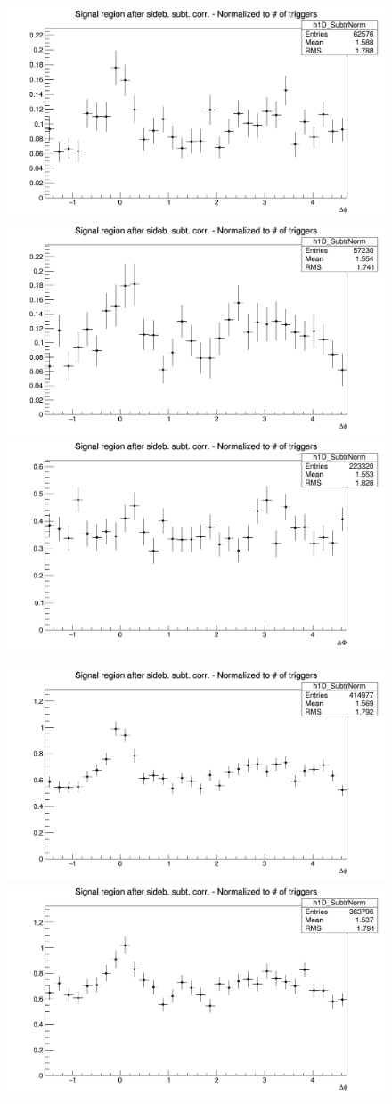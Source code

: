 \begin{figure}[!htbp]
{\includegraphics[width=0.31\linewidth, height=0.23\linewidth]{figures/Dzero/AzimCorrDistr_Dzero_Canvas_PtIntBins4to5_PoolInt_thr2dotto3dot.png}}
{\includegraphics[width=0.31\linewidth, height=0.23\linewidth]{figures/DplusPlotsweff/AzimCorrDistr_Dplus_Canvas_PtIntBins3to4_PoolInt_thr2dotto3dot.png}}
{\includegraphics[width=0.31\linewidth, height=0.23\linewidth]{figures/Dstar_wEFF/AzimCorrDistr_Dstar_Canvas_PtIntBins2to3_PoolInt_thr2dotto3dot.png}}

{\includegraphics[width=0.31\linewidth, height=0.23\linewidth]{figures/Dzero/AzimCorrDistr_Dzero_Canvas_PtIntBins4to5_PoolInt_thr1dotto3dot.png}}
{\includegraphics[width=0.31\linewidth, height=0.23\linewidth]{figures/DplusPlotsweff/AzimCorrDistr_Dplus_Canvas_PtIntBins3to4_PoolInt_thr1dotto3dot.png}}



\end{figure}
